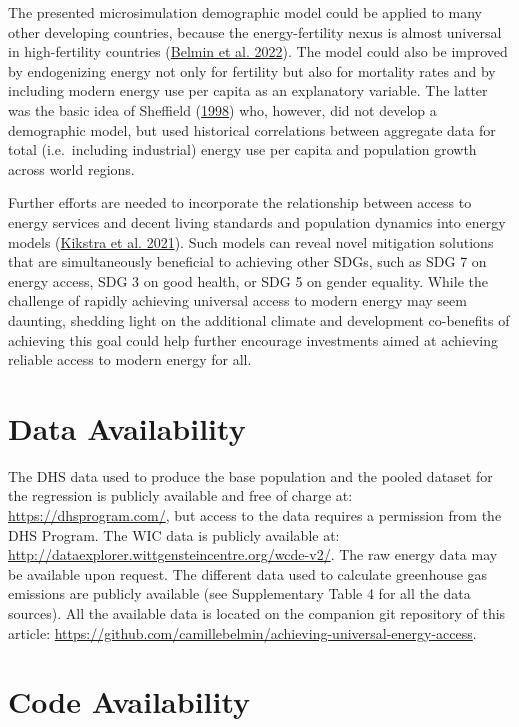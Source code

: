 \documentclass[
]{article}
\begin{document}
The presented microsimulation demographic model could be applied to many other developing countries, because the energy-fertility nexus is almost universal in high-fertility countries (\protect\hyperlink{ref-belmin_fertility_2022}{Belmin et al. 2022}). The model could also be improved by endogenizing energy not only for fertility but also for mortality rates and by including modern energy use per capita as an explanatory variable. The latter was the basic idea of Sheffield (\protect\hyperlink{ref-sheffield_world_1998}{1998}) who, however, did not develop a demographic model, but used historical correlations between aggregate data for total (i.e.~including industrial) energy use per capita and population growth across world regions.

Further efforts are needed to incorporate the relationship between access to energy services and decent living standards and population dynamics into energy models (\protect\hyperlink{ref-kikstra_decent_2021}{Kikstra et al. 2021}). Such models can reveal novel mitigation solutions that are simultaneously beneficial to achieving other SDGs, such as SDG 7 on energy access, SDG 3 on good health, or SDG 5 on gender equality. While the challenge of rapidly achieving universal access to modern energy may seem daunting, shedding light on the additional climate and development co-benefits of achieving this goal could help further encourage investments aimed at achieving reliable access to modern energy for all.

\hypertarget{data-availability}{%
\section*{Data Availability}\label{data-availability}}

The DHS data used to produce the base population and the pooled dataset for the regression is publicly available and free of charge at: \url{https://dhsprogram.com/}, but access to the data requires a permission from the DHS Program. The WIC data is publicly available at: \url{http://dataexplorer.wittgensteincentre.org/wcde-v2/}. The raw energy data may be available upon request. The different data used to calculate greenhouse gas emissions are publicly available (see Supplementary Table 4 for all the data sources). All the available data is located on the companion git repository of this article: \url{https://github.com/camillebelmin/achieving-universal-energy-access}.

\hypertarget{code-availability}{%
\section*{Code Availability}\label{code-availability}}
\end{document}
